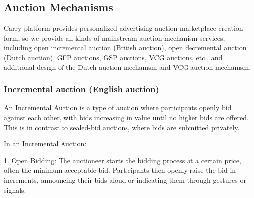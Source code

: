 
\subsection{Auction Mechanisms}
Carry platform provides personalized advertising auction marketplace creation form, so we provide all kinds of mainstream auction mechanism services, including open incremental auction (British auction), open decremental auction (Dutch auction), GFP auctions, GSP auctions, VCG auctions, etc., and additional design of the Dutch auction mechanism and VCG auction mechanism.

\subsubsection{Incremental auction (English auction)}
An Incremental Auction is a type of auction where participants openly bid against each other, with bids increasing in value until no higher bids are offered. This is in contrast to sealed-bid auctions, where bids are submitted privately.

In an Incremental Auction:

1. Open Bidding: The auctioneer starts the bidding process at a certain price, often the minimum acceptable bid. Participants then openly raise the bid in increments, announcing their bids aloud or indicating them through gestures or signals.

